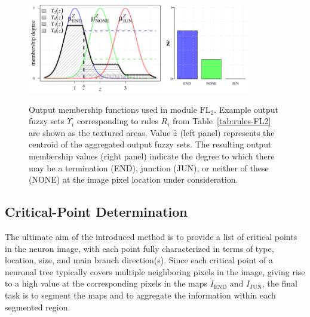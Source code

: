 \begin{figure}[!t]
	\centering
	\includegraphics[height=10.5em]{gamma_1}%
	\includegraphics[height=10.5em]{gamma_2}
	\caption{Output membership functions used in module $\mathrm{FL}_{2}$. Example output fuzzy sets $\Upsilon_{\!i}$ corresponding to rules $R_i$ from Table~\ref{tab:rules-FL2} are shown as the textured areas. Value $\hat{z}$ (left panel) represents the centroid of the aggregated output fuzzy sets. The resulting output membership values (right panel) indicate the degree to which there may be a termination (END), junction (JUN), or neither of these (NONE) at the image pixel location under consideration.}
	\label{fig10}
\end{figure}

\subsection{Critical-Point Determination}
\label{sec:CPextraction}
The ultimate aim of the introduced method is to provide a list of critical points in the neuron image, with each point fully characterized in terms of type, location, size, and main branch direction(s). Since each critical point of a neuronal tree typically covers multiple neighboring pixels in the image, giving rise to a high value at the corresponding pixels in the maps $I_{\textrm{END}}$ and $I_{\textrm{JUN}}$, the final task is to segment the maps and to aggregate the information within each segmented region.

